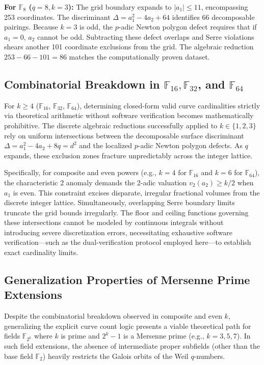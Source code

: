 \documentclass[12pt, letterpaper]{article}
\begin{document}
\textbf{For $\mathbb{F}_8$ ($q=8, k=3$):}
The grid boundary expands to $|a_1| \le 11$, encompassing 253 coordinates. The discriminant $\Delta = a_1^2 - 4a_2 + 64$ identifies 66 decomposable pairings. Because $k=3$ is odd, the $p$-adic Newton polygon defect requires that if $a_1 = 0$, $a_2$ cannot be odd. Subtracting these defect overlaps and Serre violations shears another 101 coordinate exclusions from the grid. The algebraic reduction $253 - 66 - 101 = 86$ matches the computationally proven dataset.

\subsection{Combinatorial Breakdown in $\mathbb{F}_{16}, \mathbb{F}_{32}$, and $\mathbb{F}_{64}$}
For $k \ge 4$ ($\mathbb{F}_{16}$, $\mathbb{F}_{32}$, $\mathbb{F}_{64}$), determining closed-form valid curve cardinalities strictly via theoretical arithmetic without software verification becomes mathematically prohibitive. The discrete algebraic reductions successfully applied to $k \in \{1, 2, 3\}$ rely on uniform intersections between the decomposable surface discriminant $\Delta = a_1^2 - 4a_2 + 8q = d^2$ and the localized $p$-adic Newton polygon defects. As $q$ expands, these exclusion zones fracture unpredictably across the integer lattice. 

Specifically, for composite and even powers (e.g., $k=4$ for $\mathbb{F}_{16}$ and $k=6$ for $\mathbb{F}_{64}$), the characteristic 2 anomaly demands the 2-adic valuation $v_2(a_2) \ge k/2$ when $a_1$ is even. This constraint excises disparate, irregular fractional volumes from the discrete integer lattice. Simultaneously, overlapping Serre boundary limits truncate the grid bounds irregularly. The floor and ceiling functions governing these intersections cannot be modeled by continuous integrals without introducing severe discretization errors, necessitating exhaustive software verification---such as the dual-verification protocol employed here---to establish exact cardinality limits.

\subsection{Generalization Properties of Mersenne Prime Extensions}
Despite the combinatorial breakdown observed in composite and even $k$, generalizing the explicit curve count logic presents a viable theoretical path for fields $\mathbb{F}_{2^k}$ where $k$ is prime and $2^k - 1$ is a Mersenne prime (e.g., $k=3, 5, 7$). In such field extensions, the absence of intermediate proper subfields (other than the base field $\mathbb{F}_2$) heavily restricts the Galois orbits of the Weil $q$-numbers. 
\end{document}
